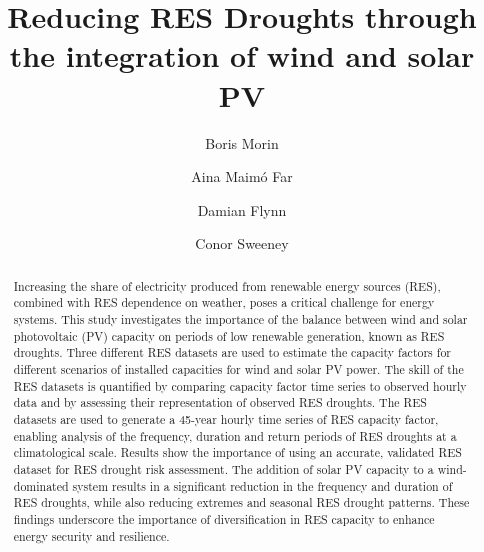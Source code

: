 \documentclass[preprint, 12pt]{elsarticle}
\begin{document}
\begin{frontmatter}
	

\title{Reducing RES Droughts through the integration of wind and solar PV}

\author[Math]{Boris Morin }

\author[Math]{Aina Maimó Far}

\author[Eng]{Damian Flynn}

\author[Math]{Conor Sweeney}




\begin{abstract}
Increasing the share of electricity produced from renewable energy sources (RES), combined with RES dependence on weather, poses a critical challenge for energy systems. This study investigates the importance of the balance between wind and solar photovoltaic (PV) capacity on periods of low renewable generation, known as RES droughts. Three different RES datasets are used to estimate the capacity factors for different scenarios of installed capacities for wind and solar PV power. The skill of the RES datasets is quantified by comparing capacity factor time series to observed hourly data and by assessing their representation of observed RES droughts. The RES datasets are used to generate a 45-year hourly time series of RES capacity factor, enabling analysis of the frequency, duration and return periods of RES droughts at a climatological scale. Results show the importance of using an accurate, validated RES dataset for RES drought risk assessment. The addition of solar PV capacity to a wind-dominated system results in a significant reduction in the frequency and duration of RES droughts, while also reducing extremes and seasonal RES drought patterns. These findings underscore the importance of diversification in RES capacity to enhance energy security and resilience.
\end{abstract}


\end{frontmatter}
\end{document}
